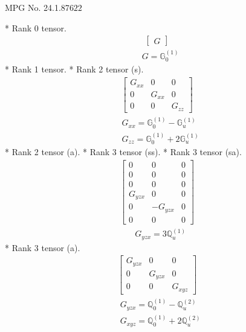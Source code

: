 \documentclass[fleqn,8pt,landscape]{jsarticle}
\begin{document}
\setcounter{MaxMatrixCols}{32}

\renewcommand{\tablename}{Table~}
\renewcommand{\figurename}{Figure~}
\begin{center}
\LARGE
MPG No. 24.1.87\quad$622$
\end{center}
* Rank 0 tensor.
\begin{align*}
\begin{bmatrix} G \end{bmatrix}
\end{align*}
\begin{align*}
& G = \mathbb{G}_{0}^{(1)}
\end{align*}
* Rank 1 tensor.
* Rank 2 tensor (s).
\begin{align*}
\begin{bmatrix} G_{xx} & 0 & 0 \\ 0 & G_{xx} & 0 \\ 0 & 0 & G_{zz} \end{bmatrix}
\end{align*}
\begin{align*}
& G_{xx} = \mathbb{G}_{0}^{(1)} - \mathbb{G}_{u}^{(1)} \\
& G_{zz} = \mathbb{G}_{0}^{(1)} + 2 \mathbb{G}_{u}^{(1)}
\end{align*}
* Rank 2 tensor (a).
* Rank 3 tensor (ss).
* Rank 3 tensor (sa).
\begin{align*}
\begin{bmatrix} 0 & 0 & 0 \\ 0 & 0 & 0 \\ 0 & 0 & 0 \\ G_{yzx} & 0 & 0 \\ 0 & - G_{yzx} & 0 \\ 0 & 0 & 0 \end{bmatrix}
\end{align*}
\begin{align*}
& G_{yzx} = 3 \mathbb{Q}_{u}^{(1)}
\end{align*}
* Rank 3 tensor (a).
\begin{align*}
\begin{bmatrix} G_{yzx} & 0 & 0 \\ 0 & G_{yzx} & 0 \\ 0 & 0 & G_{xyz} \end{bmatrix}
\end{align*}
\begin{align*}
& G_{yzx} = \mathbb{Q}_{0}^{(1)} - \mathbb{Q}_{u}^{(2)} \\
& G_{xyz} = \mathbb{Q}_{0}^{(1)} + 2 \mathbb{Q}_{u}^{(2)}
\end{align*}
\end{document}
